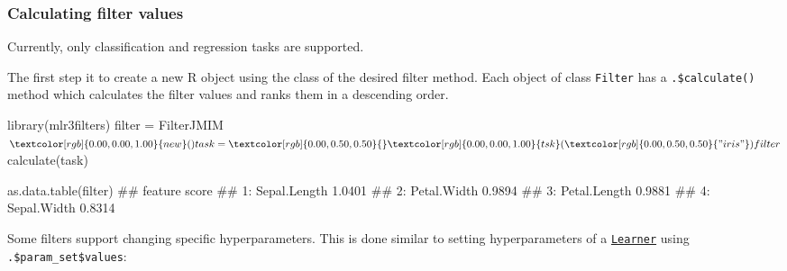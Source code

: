 \documentclass[]{article}
\newenvironment{Shaded}{}{}
\newcommand{\KeywordTok}[1]{\textcolor[rgb]{0.00,0.00,1.00}{#1}}
\newcommand{\NormalTok}[1]{#1}
\newcommand{\OperatorTok}[1]{#1}
\newcommand{\StringTok}[1]{\textcolor[rgb]{0.00,0.50,0.50}{#1}}
\renewenvironment{Shaded} {\begin{snugshade}\small} {\end{snugshade}}
\begin{document}
\hypertarget{fs-calc}{%
\subsubsection{Calculating filter values}\label{fs-calc}}

Currently, only classification and regression tasks are supported.

The first step it to create a new R object using the class of the desired filter method.
Each object of class \texttt{Filter} has a \texttt{.\$calculate()} method which calculates the filter values and ranks them in a descending order.

\begin{Shaded}
\begin{Highlighting}[]
\KeywordTok{library}\NormalTok{(mlr3filters)}
\NormalTok{filter =}\StringTok{ }\NormalTok{FilterJMIM}\OperatorTok{$}\KeywordTok{new}\NormalTok{()}

\NormalTok{task =}\StringTok{ }\KeywordTok{tsk}\NormalTok{(}\StringTok{"iris"}\NormalTok{)}
\NormalTok{filter}\OperatorTok{$}\KeywordTok{calculate}\NormalTok{(task)}

\KeywordTok{as.data.table}\NormalTok{(filter)}
\NormalTok{##         feature  score}
\NormalTok{## 1: Sepal.Length 1.0401}
\NormalTok{## 2:  Petal.Width 0.9894}
\NormalTok{## 3: Petal.Length 0.9881}
\NormalTok{## 4:  Sepal.Width 0.8314}
\end{Highlighting}
\end{Shaded}

Some filters support changing specific hyperparameters.
This is done similar to setting hyperparameters of a \href{https://mlr3.mlr-org.com/reference/Learner.html}{\texttt{Learner}} using \texttt{.\$param\_set\$values}:
\end{document}
